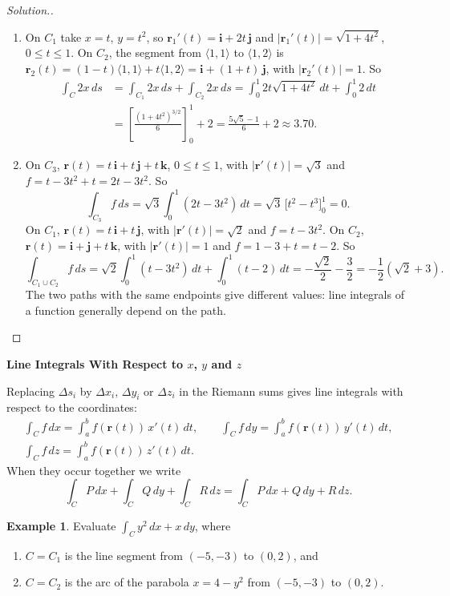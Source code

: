 \documentclass[11pt,a4paper]{article}
\theoremstyle{definition}
\newtheorem{exa}[thm]{Example}
\newenvironment{solution}
  {\renewcommand{\qedsymbol}{}\begin{proof}[\textit{Solution}.]}
  {\end{proof}}
\newcommand{\subhead}[1]{%
  \par\medskip\noindent\textbf{#1}\par\nobreak\smallskip}
\begin{document}
\begin{solution}
\begin{enumerate}
\item On $C_1$ take $x = t$, $y = t^2$, so $\mathbf r_1'(t) = \mathbf i +
2t\,\mathbf j$ and $|\mathbf r_1'(t)| = \sqrt{1 + 4t^2}$, $0\leq t\leq 1$. On
$C_2$, the segment from $\langle 1,1\rangle$ to $\langle 1,2\rangle$ is
$\mathbf r_2(t) = (1-t)\langle 1,1\rangle + t\langle 1,2\rangle = \mathbf i + (1
+ t)\,\mathbf j$, with $|\mathbf r_2'(t)| = 1$. So
\begin{align*}
\int_C 2x\,ds & = \int_{C_1}2x\,ds + \int_{C_2}2x\,ds = \int^1_0 2t \sqrt{1 +
4t^2}\,dt + \int^1_0 2\,dt\\
& = \left[\frac{(1 + 4t^2)^{3/2}}{6}\right]_0^1 + 2 = \frac{5\sqrt{5}-1}{6} + 2
\approx 3.70 .
\end{align*}

\item On $C_3$, $\mathbf r(t) = t\,\mathbf i + t\,\mathbf j + t\,\mathbf k$,
$0\leq t\leq 1$, with $|\mathbf r'(t)| = \sqrt3$ and $f = t - 3t^2 + t = 2t -
3t^2$. So
\[\int_{C_3} f\,ds = \sqrt3\int^1_0 (2t-3t^2)\,dt = \sqrt3\,\big[t^2 -
t^3\big]_0^1 = 0 .\]
On $C_1$, $\mathbf r(t) = t\,\mathbf i + t\,\mathbf j$, with
$|\mathbf r'(t)| = \sqrt2$ and $f = t - 3t^2$. On $C_2$,
$\mathbf r(t) = \mathbf i + \mathbf j + t\,\mathbf k$, with $|\mathbf r'(t)| = 1$
and $f = 1 - 3 + t = t - 2$. So
\[\int_{C_1\cup C_2}f\,ds = \sqrt2\int^1_0 (t-3t^2)\,dt + \int^1_0 (t-2)\,dt =
-\frac{\sqrt2}{2} - \frac32 = -\frac{1}{2}(\sqrt{2}+3) .\]
The two paths with the same endpoints give different values: line integrals of
a function generally depend on the path.
\end{enumerate}
\end{solution}

\subhead{Line Integrals With Respect to $x$, $y$ and $z$}

Replacing $\Delta s_i$ by $\Delta x_i$, $\Delta y_i$ or $\Delta z_i$ in the
Riemann sums gives line integrals with respect to the coordinates:
\begin{gather*}
\int_C f\,dx = \int^b_a f(\mathbf r(t))\, x'(t)\, dt ,\qquad \int_C f\,dy =
\int^b_a f(\mathbf r(t))\, y'(t)\, dt ,\\
\int_C f\,dz = \int^b_a f(\mathbf r(t))\,z'(t)\, dt .
\end{gather*}
When they occur together we write
\[\int_C P\,dx + \int_C Q\,dy + \int_C R\,dz = \int_C P\,dx + Q\,dy + R\,dz .\]

\begin{exa}
\label{ex:dxdy}
Evaluate $\int_C y^2\,dx + x\,dy$, where
\begin{enumerate}
\item $C=C_1$ is the line segment from $(-5,-3)$ to $(0,2)$, and

\item $C = C_2$ is the arc of the parabola $x = 4-y^2$ from $(-5,-3)$ to $(0,2)$.
\end{enumerate}
\end{exa}
\end{document}
